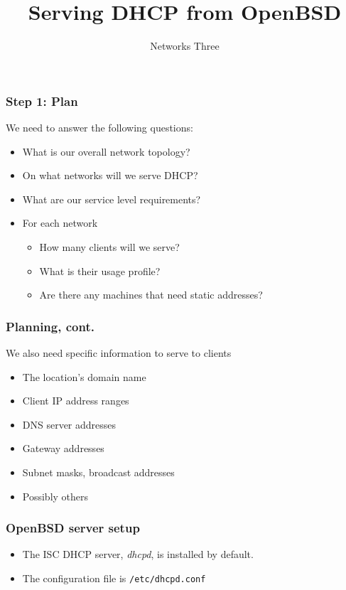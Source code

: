 \documentclass[10pt]{beamer}
\title{Serving DHCP from OpenBSD}
\author[IN715]{Networks Three}
\institute[Otago Polytechnic]{
  Otago Polytechnic \\
  Dunedin, New Zealand \\
}
\date{}
\begin{document}
\begin{frame}[plain]
  \titlepage
\end{frame}


\begin{frame}
  \frametitle{Step 1: Plan}

  We need to answer the following questions:
  \begin{itemize}
    \item What is our overall network topology?
    \item On what networks will we serve DHCP?
    \item What are our service level requirements?
    \item For each network
      \begin{itemize}
        \item How many clients will we serve?
        \item What is their usage profile?
        \item Are there any machines that need static addresses?
      \end{itemize}
  \end{itemize}  
\end{frame}


\begin{frame}
  \frametitle{Planning, cont.}
  
  We also need specific information to serve to clients
  \begin{itemize}
    \item The location's domain name
    \item Client IP address ranges
    \item DNS server addresses
    \item Gateway addresses
    \item Subnet masks, broadcast addresses
    \item Possibly others
  \end{itemize}  
\end{frame}


\begin{frame}
  \frametitle{OpenBSD server setup}
  \begin{itemize}
    \item The ISC DHCP server, \emph{dhcpd}, is installed by default.
    \item The configuration file is \texttt{/etc/dhcpd.conf}
  \end{itemize}  
\end{frame}
\end{document}
